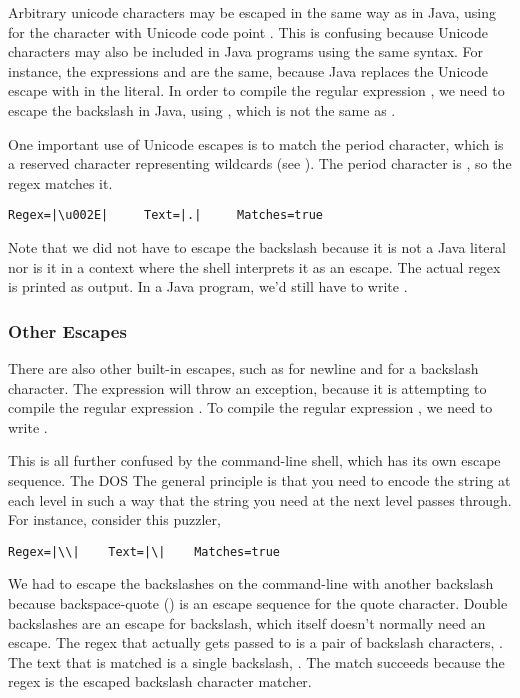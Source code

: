 Arbitrary unicode characters may be escaped in the same way as in
Java, using  for the character with Unicode
code point .  This is confusing because
Unicode characters may also be included in Java programs using the
same syntax.  For instance, the expressions
 and 
are the same, because Java replaces the Unicode escape
 with  in the literal.  In order to compile
the regular expression , we need to escape the
backslash in Java, using ,
which is not the same as .

One important use of Unicode escapes is to match the period character,
which is a reserved character representing wildcards (see
).  The period character is , 
so the regex  matches it. 

%
%
\begin{verbatim}
Regex=|\u002E|     Text=|.|     Matches=true
\end{verbatim}
%
Note that we did not have to escape the backslash because it is not a
Java literal nor is it in a context where the shell interprets it as
an escape.  The actual regex is printed as output.  In a Java program,
we'd still have to write .


\subsubsection{Other Escapes}

There are also other built-in escapes, such as  for
newline and \code{{\bk}{\bk}} for a backslash character.  The expression
 will throw an exception, because
it is attempting to compile the regular expression \code{{\bk}}.  To
compile the regular expression \code{{\bk}{\bk}}, we need to write
.  

This is all further confused by the command-line shell, which has its
own escape sequence.  The DOS The general principle is that you need to encode
the string at each level in such a way that the string you need at the
next level passes through.  For instance, consider this puzzler,
%
%
\begin{verbatim}
Regex=|\\|    Text=|\|    Matches=true
\end{verbatim}
%
We had to escape the backslashes on the command-line with another
backslash because backspace-quote () is an escape
sequence for the quote character.  Double backslashes are an escape
for backslash, which itself doesn't normally need an escape.  The
regex that actually gets passed to  is a pair of
backslash characters, \code{\bk\bk}.  The text that is matched is a
single backslash, \code{\bk}.  The match succeeds because the regex
\code{\bk\bk} is the escaped backslash character matcher.

